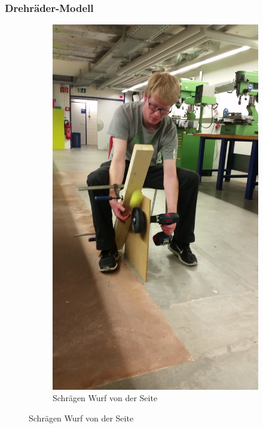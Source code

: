 \subsubsection{Drehräder-Modell}
\begin{figure}[h!]
	\begin{subfigure}{.5\textwidth}
		\includegraphics[width=1\textwidth]{../../fig/Versuch_Drehrad.png}
		\caption{Schrägen Wurf von der Seite}
		\label{fig:Aufbau der Versuch}
	\end{subfigure} %

\end{figure}
